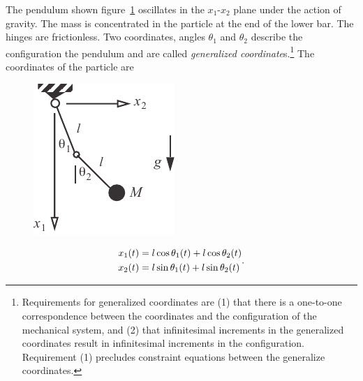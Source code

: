 \documentclass{AeroStructure-ERJohnson}
\begin{document}
\begin{example}\label{ex18.1}
\setcounter{equation}{0}\def\theequation{\alph{equation}}The pendulum shown figure~\ref{fig18.7} oscillates in the $x_1$-$x_2$ plane under the action of gravity. The mass is concentrated in the particle at the end of the lower bar. The hinges are frictionless. Two coordinates, angles $\theta_1$ and $\theta_2$ describe the configuration the pendulum and are called \textit{generalized coordinate}s.\footnote{Requirements for generalized coordinates are (1) that there is a one-to-one correspondence between the coordinates and the configuration of the mechanical system, and (2) that infinitesimal increments in the generalized coordinates result in infinitesimal increments in the configuration. Requirement (1) precludes constraint equations between the generalize coordinates.} The coordinates of the particle are

\begin{figure}
\includegraphics{Figure_18-7.pdf}
\caption{\label{fig18.7}}
\end{figure}
\begin{equation}\label{ex18.1a}
\vspace*{-2\baselineskip}
\begin{split}
&x_{1}(t)=l \cos \theta_{1}(t)+l \cos \theta_{2}(t) \\&x_{2}(t)=l \sin \theta_{1}(t)+l \sin \theta_{2}(t)
\end{split}.
\end{equation}


\end{example}
\end{document}
